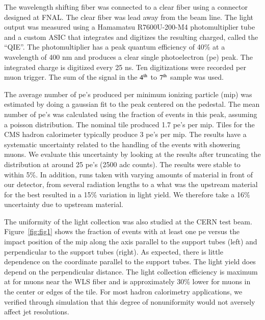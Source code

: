 \documentclass[review]{elsarticle}
\begin{document}
The wavelength shifting fiber was connected to a clear fiber using a connector designed at FNAL.  The clear fiber was lead away from the beam line.
The light output was measured using a Hamamatsu R7600U-200-M4 photomultiplier tube and a custom ASIC that integrates and digitizes the resulting charged, called the ``QIE''\cite{qie}.  The photomultiplier has a peak quantum efficiency of 40\% at a wavelength of 400 nm and produces a clear single photoelectron (pe) peak.
The integrated charge is digitized every 25 ns.  Ten digitizations were recorded per muon trigger.  The sum of the signal in the ${\rm 4^{th}}$ to ${\rm 7^{th}}$ sample was used.


The average number of pe's produced per minimum ionizing particle (mip) was estimated by doing a gaussian fit to the peak centered on the pedestal.  The mean number of pe's was calculated using the fraction of events in this peak, assuming a poisson distribution.  The nominal tile produced 1.7 pe's per mip.
Tiles for the CMS hadron calorimeter typically produce 3 pe's per mip\cite{CMSHB}.
The results have a systematic uncertainty related to the handling of the events with showering muons.  We evaluate this uncertainty by looking at the results after truncating the distribution at around 25 pe's (2500 adc counts).  The results were stable to within 5\%.  In addition, runs taken with varying amounts of material in front of our detector, from several radiation lengths to a {\color{red} what was the upstream material for the best} resulted in a 15\% variation in light yield.  We therefore take a 16\% uncertainty due to upstream material.

The uniformity of the light collection was also studied at the CERN test beam.
Figure~\ref{fig:fig1} shows the fraction of events with at least one
pe versus the impact position of the mip along the axis parallel to the support tubes (left) and perpendicular to the support tubes (right).  As expected, there is little dependence on the coordinate parallel to the support tubes.  The light yield does depend on the perpendicular distance.  The light collection efficiency is maximum at for muons near the WLS fiber and is approximately 30\% lower for muons in the center or edges of the tile.  For most hadron calorimetry applications, we verified through simulation that this degree of nonuniformity would not aversely affect jet resolutions.
\end{document}
